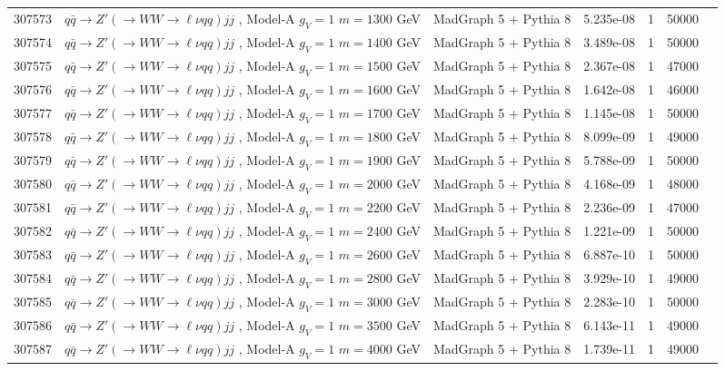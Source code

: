\begin{landscape}
\begin{table}[!htb]
\begin{footnotesize}
\begin{center}
\begin{tabular}{c|l|c|c|c|cr}
	307573 & $q\bar{q} \to Z'\left(\to WW \to \ell\nu qq\right) jj$ , Model-A $g_V=1$ $m=1300$ GeV& MadGraph 5 + Pythia 8 & 5.235e-08 & 1  & 50000 \\
	307574 & $q\bar{q} \to Z'\left(\to WW \to \ell\nu qq\right) jj$ , Model-A $g_V=1$ $m=1400$ GeV& MadGraph 5 + Pythia 8 & 3.489e-08 & 1  & 50000 \\
	307575 & $q\bar{q} \to Z'\left(\to WW \to \ell\nu qq\right) jj$ , Model-A $g_V=1$ $m=1500$ GeV& MadGraph 5 + Pythia 8 & 2.367e-08 & 1  & 47000 \\
	307576 & $q\bar{q} \to Z'\left(\to WW \to \ell\nu qq\right) jj$ , Model-A $g_V=1$ $m=1600$ GeV& MadGraph 5 + Pythia 8 & 1.642e-08 & 1  & 46000 \\
	307577 & $q\bar{q} \to Z'\left(\to WW \to \ell\nu qq\right) jj$ , Model-A $g_V=1$ $m=1700$ GeV& MadGraph 5 + Pythia 8 & 1.145e-08 & 1  & 50000 \\
	307578 & $q\bar{q} \to Z'\left(\to WW \to \ell\nu qq\right) jj$ , Model-A $g_V=1$ $m=1800$ GeV& MadGraph 5 + Pythia 8 & 8.099e-09 & 1  & 49000 \\
	307579 & $q\bar{q} \to Z'\left(\to WW \to \ell\nu qq\right) jj$ , Model-A $g_V=1$ $m=1900$ GeV& MadGraph 5 + Pythia 8 & 5.788e-09 & 1  & 50000 \\
	307580 & $q\bar{q} \to Z'\left(\to WW \to \ell\nu qq\right) jj$ , Model-A $g_V=1$ $m=2000$ GeV& MadGraph 5 + Pythia 8 & 4.168e-09 & 1  & 48000 \\
	307581 & $q\bar{q} \to Z'\left(\to WW \to \ell\nu qq\right) jj$ , Model-A $g_V=1$ $m=2200$ GeV& MadGraph 5 + Pythia 8 & 2.236e-09 & 1  & 47000 \\
	307582 & $q\bar{q} \to Z'\left(\to WW \to \ell\nu qq\right) jj$ , Model-A $g_V=1$ $m=2400$ GeV& MadGraph 5 + Pythia 8 & 1.221e-09 & 1  & 50000 \\
	307583 & $q\bar{q} \to Z'\left(\to WW \to \ell\nu qq\right) jj$ , Model-A $g_V=1$ $m=2600$ GeV& MadGraph 5 + Pythia 8 & 6.887e-10 & 1  & 50000 \\
	307584 & $q\bar{q} \to Z'\left(\to WW \to \ell\nu qq\right) jj$ , Model-A $g_V=1$ $m=2800$ GeV& MadGraph 5 + Pythia 8 & 3.929e-10 & 1  & 49000 \\
	307585 & $q\bar{q} \to Z'\left(\to WW \to \ell\nu qq\right) jj$ , Model-A $g_V=1$ $m=3000$ GeV& MadGraph 5 + Pythia 8 & 2.283e-10 & 1  & 50000 \\
	307586 & $q\bar{q} \to Z'\left(\to WW \to \ell\nu qq\right) jj$ , Model-A $g_V=1$ $m=3500$ GeV& MadGraph 5 + Pythia 8 & 6.143e-11 & 1  & 49000 \\
	307587 & $q\bar{q} \to Z'\left(\to WW \to \ell\nu qq\right) jj$ , Model-A $g_V=1$ $m=4000$ GeV& MadGraph 5 + Pythia 8 & 1.739e-11 & 1  & 49000 \\
\hline\hline
\end{tabular}
\end{center}
\end{footnotesize}
\end{table}


\end{landscape}
